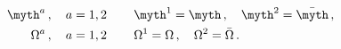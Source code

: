 \begin{equation}
  \begin{aligned}
 \myth^{a}&\,,\quad a=1,2\, \qquad
 \myth^1=\myth\,,\quad
\myth^2=\bar\myth\,,\\
 {\Omega^{a}}&\,,\quad a=1,2\, \qquad
 {\Omega^1}={\Omega}\,,\quad 
{\Omega^2}={\bar\Omega}\,.
\end{aligned}
\end{equation}

